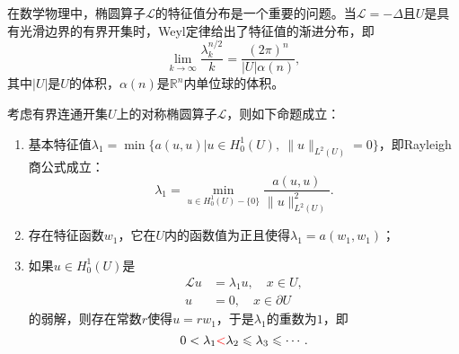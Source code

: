 \documentclass[a4paper,10pt]{ctexart}
\begin{document}
在数学物理中，椭圆算子$ \mathcal{L} $的特征值分布是一个重要的问题。当$ \mathcal{L} = -\Delta $且$ U $是具有光滑边界的有界开集时，Weyl定律给出了特征值的渐进分布，即
\begin{equation}
    \lim_{k\to\infty} \dfrac{\lambda_k^{n / 2}}{k} = \frac{(2\pi)^n}{|U|\alpha(n)},
\end{equation}
其中$ |U| $是$ U $的体积，$ \alpha(n) $是$ \mathbb{R}^n $内单位球的体积。

\begin{theorem}
    考虑有界连通开集$ U $上的对称椭圆算子$ \mathcal{L} $，则如下命题成立：
    \begin{enumerate}
        \item 基本特征值$ \lambda_1 = \min \{a(u,u)| u\in H^1_0(U),\ \| u \|_{L^2(U)} = 0\} $，即Rayleigh商公式成立：
        \begin{equation}
            \lambda_1 = \min_{u\in H^1_0(U) - \{0\}} \frac{a(u,u)}{\| u \|_{L^2(U)}^2}.
        \end{equation}
        \item 存在特征函数$ w_1 $，它在$ U $内的函数值为正且使得$ \lambda_1 = a(w_1,w_1) $；
        \item 如果$ u\in H^1_0(U) $是
        \[
            \begin{aligned}
                \mathcal{L}u &= \lambda_1 u, \quad x\in  U,\\
                u &= 0, \quad x\in \partial U
            \end{aligned}
        \]
        的弱解，则存在常数$ r $使得$ u = rw_1 $，于是$ \lambda_1 $的重数为$ 1 $，即
        \begin{equation}
            0 < \lambda_1 \textcolor{red}{<} \lambda_2\leqslant \lambda_3\leqslant \cdots.
        \end{equation}
    \end{enumerate}
\end{theorem}
\end{document}
